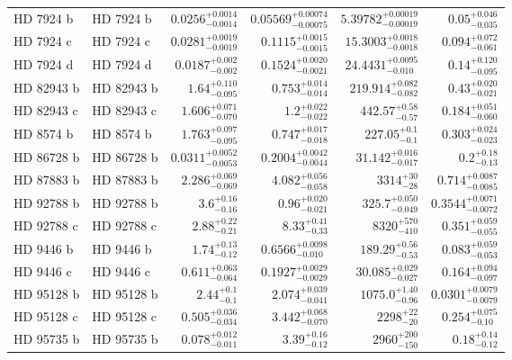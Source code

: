 \begin{longtable*}{llrrrr}
HD 7924 b & HD 7924 b & $0.0256^{+0.0014}_{-0.0014}$ & $0.05569^{+0.00074}_{-0.00075}$ & $5.39782^{+0.00019}_{-0.00019}$ & $0.05^{+0.046}_{-0.035}$ \\ 
HD 7924 c & HD 7924 c & $0.0281^{+0.0019}_{-0.0019}$ & $0.1115^{+0.0015}_{-0.0015}$ & $15.3003^{+0.0018}_{-0.0018}$ & $0.094^{+0.072}_{-0.061}$ \\ 
HD 7924 d & HD 7924 d & $0.0187^{+0.002}_{-0.002}$ & $0.1524^{+0.0020}_{-0.0021}$ & $24.4431^{+0.0095}_{-0.010}$ & $0.14^{+0.120}_{-0.095}$ \\ 
HD 82943 b & HD 82943 b & $1.64^{+0.110}_{-0.095}$ & $0.753^{+0.014}_{-0.014}$ & $219.914^{+0.082}_{-0.082}$ & $0.43^{+0.020}_{-0.021}$ \\ 
HD 82943 c & HD 82943 c & $1.606^{+0.071}_{-0.070}$ & $1.2^{+0.022}_{-0.022}$ & $442.57^{+0.58}_{-0.57}$ & $0.184^{+0.051}_{-0.060}$ \\ 
HD 8574 b & HD 8574 b & $1.763^{+0.097}_{-0.095}$ & $0.747^{+0.017}_{-0.018}$ & $227.05^{+0.1}_{-0.1}$ & $0.303^{+0.024}_{-0.023}$ \\ 
HD 86728 b & HD 86728 b & $0.0311^{+0.0052}_{-0.0053}$ & $0.2004^{+0.0042}_{-0.0044}$ & $31.142^{+0.016}_{-0.017}$ & $0.2^{+0.18}_{-0.13}$ \\ 
HD 87883 b & HD 87883 b & $2.286^{+0.069}_{-0.069}$ & $4.082^{+0.056}_{-0.058}$ & $3314^{+30}_{-28}$ & $0.714^{+0.0087}_{-0.0085}$ \\ 
HD 92788 b & HD 92788 b & $3.6^{+0.16}_{-0.16}$ & $0.96^{+0.020}_{-0.021}$ & $325.7^{+0.050}_{-0.049}$ & $0.3544^{+0.0071}_{-0.0072}$ \\ 
HD 92788 c & HD 92788 c & $2.88^{+0.22}_{-0.21}$ & $8.33^{+0.41}_{-0.33}$ & $8320^{+570}_{-410}$ & $0.351^{+0.059}_{-0.055}$ \\ 
HD 9446 b & HD 9446 b & $1.74^{+0.13}_{-0.12}$ & $0.6566^{+0.0098}_{-0.010}$ & $189.29^{+0.56}_{-0.53}$ & $0.083^{+0.059}_{-0.053}$ \\ 
HD 9446 c & HD 9446 c & $0.611^{+0.063}_{-0.064}$ & $0.1927^{+0.0029}_{-0.0029}$ & $30.085^{+0.029}_{-0.027}$ & $0.164^{+0.094}_{-0.097}$ \\ 
HD 95128 b & HD 95128 b & $2.44^{+0.1}_{-0.1}$ & $2.074^{+0.039}_{-0.041}$ & $1075.0^{+1.40}_{-0.96}$ & $0.0301^{+0.0079}_{-0.0079}$ \\ 
HD 95128 c & HD 95128 c & $0.505^{+0.036}_{-0.034}$ & $3.442^{+0.068}_{-0.070}$ & $2298^{+22}_{-20}$ & $0.254^{+0.075}_{-0.10}$ \\ 
HD 95735 b & HD 95735 b & $0.078^{+0.012}_{-0.011}$ & $3.39^{+0.16}_{-0.12}$ & $2960^{+200}_{-150}$ & $0.18^{+0.14}_{-0.12}$ \\ 

\end{longtable*}
